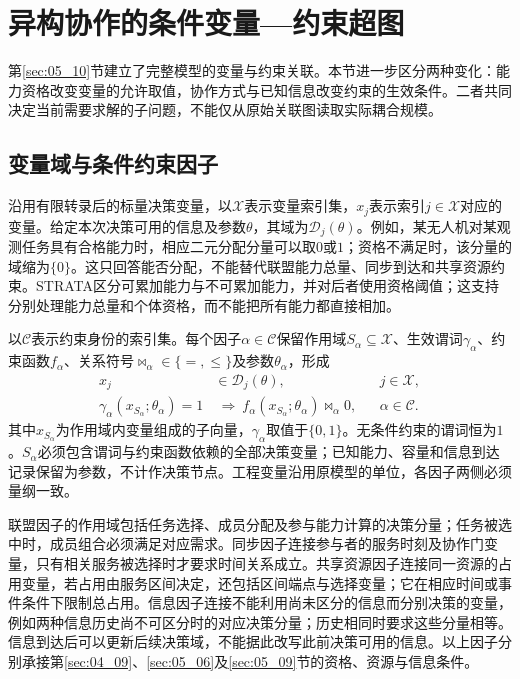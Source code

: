 \section{异构协作的条件变量—约束超图}
\label{sec:05_11}

第\ref{sec:05_10}节建立了完整模型的变量与约束关联。本节进一步区分两种变化：能力资格改变变量的允许取值，协作方式与已知信息改变约束的生效条件。二者共同决定当前需要求解的子问题，不能仅从原始关联图读取实际耦合规模。

\subsection{变量域与条件约束因子}

沿用有限转录后的标量决策变量，以$\mathcal X$表示变量索引集，$x_j$表示索引$j\in\mathcal X$对应的变量。给定本次决策可用的信息及参数$\theta$，其域为$\mathcal D_j(\theta)$。例如，某无人机对某观测任务具有合格能力时，相应二元分配分量可以取$0$或$1$；资格不满足时，该分量的域缩为$\{0\}$。这只回答能否分配，不能替代联盟能力总量、同步到达和共享资源约束。STRATA区分可累加能力与不可累加能力，并对后者使用资格阈值；这支持分别处理能力总量和个体资格，而不能把所有能力都直接相加\cite{STRATA2020}。

以$\mathcal C$表示约束身份的索引集。每个因子$\alpha\in\mathcal C$保留作用域$S_\alpha\subseteq\mathcal X$、生效谓词$\gamma_\alpha$、约束函数$f_\alpha$、关系符号$\bowtie_\alpha\in\{=,\leq\}$及参数$\theta_\alpha$，形成
\begin{equation}
\label{s0511:conditional_factors}
\begin{aligned}
 x_j&\in\mathcal D_j(\theta), &&j\in\mathcal X,\\
 \gamma_\alpha(x_{S_\alpha};\theta_\alpha)=1
 &\ \Longrightarrow\ 
 f_\alpha(x_{S_\alpha};\theta_\alpha)\bowtie_\alpha 0,
 &&\alpha\in\mathcal C.
\end{aligned}
\end{equation}
其中$x_{S_\alpha}$为作用域内变量组成的子向量，$\gamma_\alpha$取值于$\{0,1\}$。无条件约束的谓词恒为$1$。$S_\alpha$必须包含谓词与约束函数依赖的全部决策变量；已知能力、容量和信息到达记录保留为参数，不计作决策节点。工程变量沿用原模型的单位，各因子两侧必须量纲一致。

联盟因子的作用域包括任务选择、成员分配及参与能力计算的决策分量；任务被选中时，成员组合必须满足对应需求。同步因子连接参与者的服务时刻及协作门变量，只有相关服务被选择时才要求时间关系成立。共享资源因子连接同一资源的占用变量，若占用由服务区间决定，还包括区间端点与选择变量；它在相应时间或事件条件下限制总占用。信息因子连接不能利用尚未区分的信息而分别决策的变量，例如两种信息历史尚不可区分时的对应决策分量；历史相同时要求这些分量相等。信息到达后可以更新后续决策域，不能据此改写此前决策可用的信息。以上因子分别承接第\ref{sec:04_09}、\ref{sec:05_06}及\ref{sec:05_09}节的资格、资源与信息条件。

